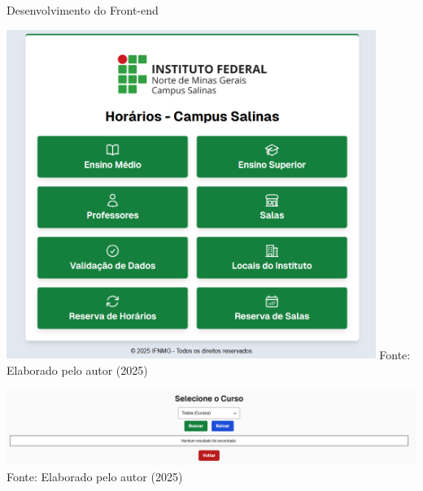 \begin{frame}{Desenvolvimento do Front-end}
    \begin{minipage}{0.48\textwidth}
        \centering
        \includegraphics[width=0.9\textwidth]{figuras/front-1.png}
        \small Fonte: Elaborado pelo autor (2025)
    \end{minipage}
    \hfill
    \begin{minipage}{0.48\textwidth}
        \centering
        \includegraphics[width=1\textwidth]{figuras/front-2.png}
        \small Fonte: Elaborado pelo autor (2025)
    \end{minipage}
\end{frame}

